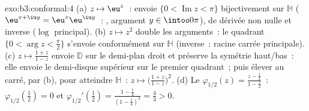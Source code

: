 \begin{solution}{exo:b3:conformal:4}
(a) $z \mapsto \eu^z$~: envoie $\{0 < \operatorname{Im}z <
\pi\}$ bijectivement sur $\mathbb H$ ($\eu^{x+\iu y} =
\eu^x\eu^{\iu y}$~: , argument $y \in
\intoo0\pi$),  de dérivée non nulle et inverse
 ($\log$ principal).
(b) $z \mapsto z^2$ double les arguments~: le quadrant
 $\{0 < \arg z < \frac\pi2\}$ s'envoie conformément
sur $\mathbb H$ (inverse~: racine carrée principale).
(c) $z \mapsto \frac{1 + z}{1 - z}$ envoie $\mathbb D$ sur
le demi-plan droit et préserve la symétrie haut/bas~: elle
envoie le demi-disque supérieur sur le premier quadrant~;
puis élever au carré, par (b), pour atteindre $\mathbb H$~:
$z \mapsto \bigl(\frac{1 + z}{1 - z}\bigr)^2$.
(d) Le  $\varphi_{1/2}(z) = \frac{z -
\frac12}{1 - \frac z2}$~: $\varphi_{1/2}(\tfrac12) = 0$ et
$\varphi_{1/2}'(\tfrac12) = \frac{1 - \frac14}{(1 -
\frac14)^2} = \frac43 > 0$.
\end{solution}

